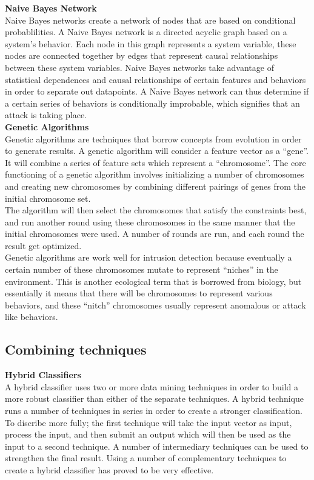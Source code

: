 \documentclass[12pt]{article} %
\begin{document}
\noindent
\textbf{Naive Bayes Network}\\
Naive Bayes networks create a network of nodes that are based on conditional probablilities. A Naive Bayes network is a directed acyclic graph based on a system's behavior. Each node in this graph represents a system variable, these nodes are connected together by edges that represent causal relationships between these system variables. Naive Bayes networks take advantage of statistical dependences and causal relationships of certain features and behaviors in order to separate out datapoints. A Naive Bayes network can thus determine if a certain series of behaviors is conditionally improbable, which signifies that an attack is taking place.\\

\noindent
\textbf{Genetic Algorithms}\\
Genetic algorithms are techniques that borrow concepts from evolution in order to generate results. A genetic algorithm will consider a feature vector as a ``gene''. It will combine a series of feature sets which represent a ``chromosome''. The core functioning of a genetic algorithm involves initializing a number of chromosomes and creating new chromosomes by combining different pairings of genes from the initial chromosome set.\\
The algorithm will then select the chromosomes that satisfy the constraints best, and run another round using these chromosomes in the same manner that the initial chromosomes were used. A number of rounds are run, and each round the result get optimized.\\
Genetic algorithms are work well for intrusion detection because eventually a certain number of these chromosomes mutate to represent ``niches'' in the environment. This is another ecological term that is borrowed from biology, but essentially it means that there will be chromosomes to represent various behaviors, and these ``nitch'' chromosomes usually represent anomalous or attack like behaviors.\\

\subsection{Combining techniques}
\noindent
\textbf{Hybrid Classifiers}\\
A hybrid classifier uses two or more data mining techniques in order to build a more robust classifier than either of the separate techniques. A hybrid technique runs a number of techniques in series in order to create a stronger classification. To discribe more fully; the first technique will take the input vector as input, process the input, and then submit an output which will then be used as the input to a second technique. A number of intermediary techniques can be used to strengthen the final result. Using a number of complementary techniques to create a hybrid classifier has proved to be very effective\cite{tsai09}.\\
\end{document}
